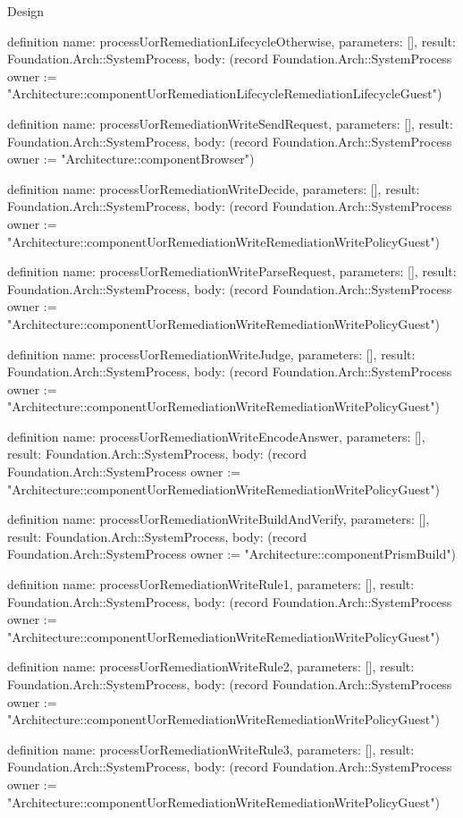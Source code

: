 \begin{lexlean}{Design}
\begin{semanticmodule}
definition{
  name: processUorRemediationLifecycleOtherwise,
  parameters: [],
  result: Foundation.Arch::SystemProcess,
  body: (record Foundation.Arch::SystemProcess {owner := "Architecture::componentUorRemediationLifecycleRemediationLifecycleGuest"})
}

definition{
  name: processUorRemediationWriteSendRequest,
  parameters: [],
  result: Foundation.Arch::SystemProcess,
  body: (record Foundation.Arch::SystemProcess {owner := "Architecture::componentBrowser"})
}

definition{
  name: processUorRemediationWriteDecide,
  parameters: [],
  result: Foundation.Arch::SystemProcess,
  body: (record Foundation.Arch::SystemProcess {owner := "Architecture::componentUorRemediationWriteRemediationWritePolicyGuest"})
}

definition{
  name: processUorRemediationWriteParseRequest,
  parameters: [],
  result: Foundation.Arch::SystemProcess,
  body: (record Foundation.Arch::SystemProcess {owner := "Architecture::componentUorRemediationWriteRemediationWritePolicyGuest"})
}

definition{
  name: processUorRemediationWriteJudge,
  parameters: [],
  result: Foundation.Arch::SystemProcess,
  body: (record Foundation.Arch::SystemProcess {owner := "Architecture::componentUorRemediationWriteRemediationWritePolicyGuest"})
}

definition{
  name: processUorRemediationWriteEncodeAnswer,
  parameters: [],
  result: Foundation.Arch::SystemProcess,
  body: (record Foundation.Arch::SystemProcess {owner := "Architecture::componentUorRemediationWriteRemediationWritePolicyGuest"})
}

definition{
  name: processUorRemediationWriteBuildAndVerify,
  parameters: [],
  result: Foundation.Arch::SystemProcess,
  body: (record Foundation.Arch::SystemProcess {owner := "Architecture::componentPrismBuild"})
}

definition{
  name: processUorRemediationWriteRule1,
  parameters: [],
  result: Foundation.Arch::SystemProcess,
  body: (record Foundation.Arch::SystemProcess {owner := "Architecture::componentUorRemediationWriteRemediationWritePolicyGuest"})
}

definition{
  name: processUorRemediationWriteRule2,
  parameters: [],
  result: Foundation.Arch::SystemProcess,
  body: (record Foundation.Arch::SystemProcess {owner := "Architecture::componentUorRemediationWriteRemediationWritePolicyGuest"})
}

definition{
  name: processUorRemediationWriteRule3,
  parameters: [],
  result: Foundation.Arch::SystemProcess,
  body: (record Foundation.Arch::SystemProcess {owner := "Architecture::componentUorRemediationWriteRemediationWritePolicyGuest"})
}


\end{semanticmodule}
\end{lexlean}
